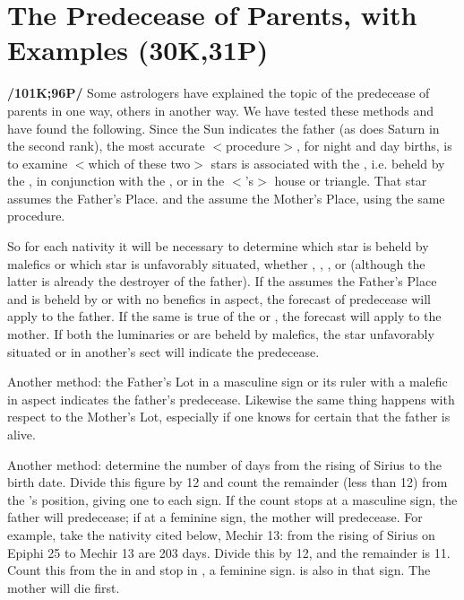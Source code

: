 \section{The Predecease of Parents, with Examples (30K,31P)}

\textbf{/101K;96P/} Some astrologers have explained the topic of the predecease of parents in one way, others in another
way. We have tested these methods and have found the following. Since the Sun indicates the father (as does Saturn in the second rank), the most accurate $<$procedure$>$, for night and day births, is to examine
$<$which of these two$>$ stars is associated  with the \Moon, i.e. beheld by the \Moon, in conjunction with the \Moon, or in the $<$\Moon’s$>$ house or triangle. That star assumes the Father’s Place. \Venus\xspace and the \Moon\xspace assume the Mother’s Place, using the same procedure. 

So for each nativity it will be necessary to determine which star is beheld by malefics or which star is unfavorably situated, whether \Sun, \Moon, \Venus, or \Saturn\xspace (although the latter is already the destroyer of the father). If the \Sun\xspace assumes the Father’s Place and is beheld by \Mars\xspace or \Saturn\xspace with no benefics in aspect, the forecast of predecease will apply to the father. If the same is true of the \Moon\xspace or \Venus, the forecast will apply to the mother. If both the luminaries or \Venus\xspace are beheld by malefics, the star unfavorably situated or in another’s sect will indicate the predecease.

Another method: the Father’s Lot in a masculine sign or its ruler with a malefic in aspect indicates the father’s predecease. Likewise the same thing happens with respect to the Mother’s Lot, especially if one knows for certain that the father is alive.

Another method: determine the number of days from the rising of Sirius to the birth date. Divide this figure by 12 and count the remainder (less than 12) from the \Moon’s position, giving one to each sign. If the count stops at a masculine sign, the father will predecease; if at a feminine sign, the mother will
predecease. For example, take the nativity cited below, Mechir 13: from the rising of Sirius on Epiphi 25 to Mechir 13 are 203 days. Divide this by 12, and the remainder is 11. Count this from the \Moon\xspace in \Scorpio\xspace and stop in \Virgo, a feminine sign. \Mars\xspace is also in that sign. The mother will die first.

